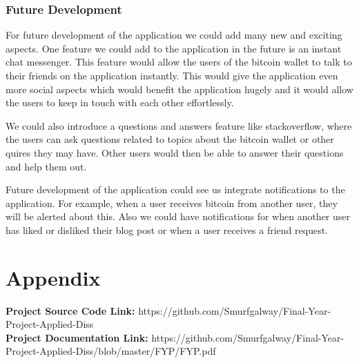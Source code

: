 \subsection{Future Development}
For future development of the application we could add many new and exciting aspects. One feature we could add to the application in the future is an instant chat messenger. This feature would allow the users of the bitcoin wallet to talk to their friends on the application instantly. This would give the application even more social aspects which would benefit the application hugely and it would allow the users to keep in touch with each other effortlessly.
\par We could also introduce a questions and answers feature like stackoverflow, where the users can ask questions related to topics about the bitcoin wallet or other quires they may have. Other users would then be able to answer their questions and help them out.
\par Future development of the application could see us integrate notifications to the application. For example, when a user receives bitcoin from another user, they will be alerted about this. Also we could have notifications for when another user has liked or disliked their blog post or when a user receives a friend request.

\chapter{Appendix}
\textbf{Project Source Code Link: } https://github.com/Smurfgalway/Final-Year-Project-Applied-Diss \\
\textbf{Project Documentation Link: } https://github.com/Smurfgalway/Final-Year-Project-Applied-Diss/blob/master/FYP/FYP.pdf\\